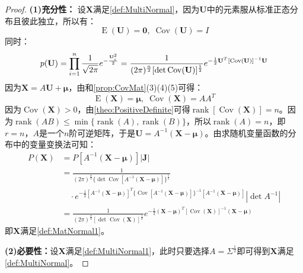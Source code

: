 \begin{proof}
	\textbf{(1)充分性：}
	设$\mathbf{X}$满足\cref{def:MultiNormal}，因为$\mathbf{U}$中的元素服从标准正态分布且彼此独立，所以有：
	\begin{equation*}
		\operatorname{E}(\mathbf{U})=\mathbf{0},\;\operatorname{Cov}(\mathbf{U})=I
	\end{equation*}
	同时：
	\begin{equation*}
		p(\mathbf{U})
		=\prod_{i=1}^n\frac{1}{\sqrt{2\pi}}e^{-\frac{\mathbf{U}_i^2}{2}} \\
		=\frac{1}{(2\pi)^{\frac{n}{2}}[\det \operatorname{Cov}(\mathbf{U})]^{\frac{1}{2}}}e^{-\frac{1}{2}\mathbf{U}^T[\operatorname{Cov}(\mathbf{U})]^{-1}\mathbf{U}}
	\end{equation*}
	因为$\mathbf{X}=A\mathbf{U}+\boldsymbol{\mu}$，由和\cref{prop:CovMat}(3)(4)(5)可得：
	\begin{equation*}
		\operatorname{E}(\mathbf{X})=\boldsymbol{\mu},\;\operatorname{Cov}(\mathbf{X})=AA^T
	\end{equation*}
	因为$\operatorname{Cov}(\mathbf{X})>0$，由\cref{theo:PositiveDefinite}可得$\operatorname{rank}[\operatorname{Cov}(\mathbf{X})]=n$。因为$\operatorname{rank}(AB)\leqslant\min\{\operatorname{rank}(A),\operatorname{rank}(B)\}$，所以$\operatorname{rank}(A)=n$，即$r=n$，$A$是一个$n$阶可逆矩阵，于是$\mathbf{U}=A^{-1}(\mathbf{X}-\boldsymbol{\mu})$。由求随机变量函数的分布中的变量变换法可知：
	\begin{align*}
		P(\mathbf{X})
		&=P[A^{-1}(\mathbf{X}-\boldsymbol{\mu})]|\mathbf{J}| \\
		&=\frac{1}{(2\pi)^{\frac{n}{2}}\{\det \operatorname{Cov}[A^{-1}(\mathbf{X}-\boldsymbol{\mu})]\}^{\frac{1}{2}}} \\
		&\quad\cdot e^{-\frac{1}{2}[A^{-1}(\mathbf{X}-\boldsymbol{\mu})]^T\{ \operatorname{Cov}[A^{-1}(\mathbf{X}-\boldsymbol{\mu})]\}^{-1}[A^{-1}(\mathbf{X}-\boldsymbol{\mu})]}|\det A^{-1}| \\
		&=\frac{1}{(2\pi)^{\frac{n}{2}}[\det \operatorname{Cov}(\mathbf{X})]^{\frac{1}{2}}}e^{-\frac{1}{2}(\mathbf{X}-\boldsymbol{\mu})^T[\operatorname{Cov}(\mathbf{X})]^{-1}(\mathbf{X}-\boldsymbol{\mu})}
	\end{align*}
	即$\mathbf{X}$满足\cref{def:MatNormal1}。\par
	\textbf{(2)必要性：}设$\mathbf{X}$满足\cref{def:MultiNormal1}，此时只要选择$A=\Sigma^\frac{1}{2}$即可得到$\mathbf{X}$满足\cref{def:MultiNormal}。
\end{proof}

